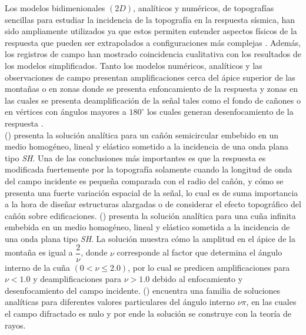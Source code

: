 \documentclass[spanish,letterpaper,12pt,twoside,openany]{article}
\begin{document}
Los modelos bidimenionales $\left( 2D \right)$, analíticos y numéricos, de topografías sencillas para estudiar la incidencia de la topografía en la respuesta sísmica, han sido ampliamente utilizados ya que estos permiten entender aspectos físicos de la respuesta que pueden ser extrapolados a configuraciones más complejas \citep{Jaramillo2013, Gomez2013, SanchezSesma1990, SanchezSesma1985, Pathak1974, Trifunac1973}. Además, los registros de campo han mostrado coincidencia cualitativa con los resultados de los modelos simplificados. Tanto los modelos numéricos, analíticos y las observaciones de campo presentan amplificaciones cerca del ápice superior de las montañas o en zonas donde se presenta enfoncamiento de la respuesta \citep{Geli1988} y zonas en las cuales se presenta deamplificación de la señal tales como el fondo de cañones o en vértices con ángulos mayores a $180^\circ$ los cuales generan desenfocamiento de la respuesta \citep{assimaki2005effects}.\\
%
\citeauthor{Trifunac1973} (\citeyear{Trifunac1973}) presenta la solución analítica para un cañón semicircular embebido en un medio homogéneo, lineal y elástico sometido a la incidencia de una onda plana tipo \textit{SH}. Una de las conclusiones más importantes es que la respuesta es modificada fuertemente por la topografía solamente cuando la longitud de onda del campo incidente es pequeña comparada con el radio del cañón, y cómo se presenta una fuerte variación espacial de la señal, lo cual es de suma importancia a la hora de diseñar estructuras alargadas o de considerar el efecto topográfico del cañón sobre edificaciones. \citeauthor{SanchezSesma1985} (\citeyear{SanchezSesma1985}) presenta la solución analítica para una cuña infinita embebida en un medio homogéneo, lineal y elástico sometida a la incidencia de una onda plana tipo \textit{SH}. La solución muestra cómo la amplitud en el ápice de la montaña es igual a $\dfrac{2}{\nu}$, donde $\nu$ corresponde al factor que determina el ángulo interno de la cuña $\left( 0 < \nu \leqslant 2.0 \right)$, por lo cual se predicen amplificaciones para $\nu < 1.0$ y deamplificaciones para $\nu > 1.0$ debido al enfocamiento y desenfocamiento del campo incidente. \citeauthor{SanchezSesma1990} (\citeyear{SanchezSesma1990}) encuentra una familia de soluciones analíticas para diferentes valores particulares del ángulo interno $\nu \pi$, en las cuales el campo difractado es nulo y por ende la solución se construye con la teoría de rayos.\\
%
\end{document}
